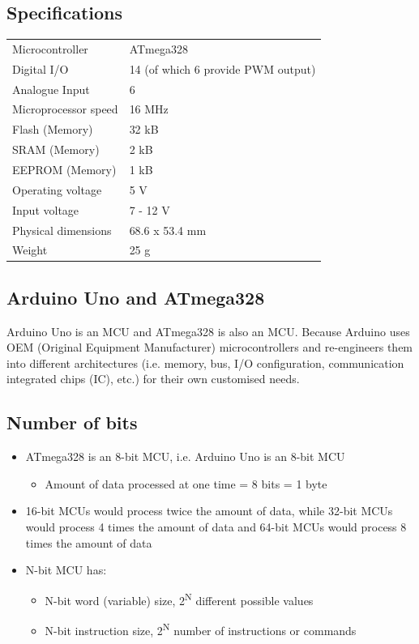 \documentclass[11pt]{article}
\begin{document}
\subsection{Specifications}
\label{sec:orgaaf1ed2}
\begin{center}
\begin{tabular}{l|l}
Microcontroller & ATmega328\\[0pt]
Digital I/O & 14 (of which 6 provide PWM output)\\[0pt]
Analogue Input & 6\\[0pt]
Microprocessor speed & 16 MHz\\[0pt]
Flash (Memory) & 32 kB\\[0pt]
SRAM (Memory) & 2 kB\\[0pt]
EEPROM (Memory) & 1 kB\\[0pt]
Operating voltage & 5 V\\[0pt]
Input voltage & 7 - 12 V\\[0pt]
Physical dimensions & 68.6 x 53.4 mm\\[0pt]
Weight & 25 g\\[0pt]
\end{tabular}
\end{center}

\subsection{Arduino Uno and ATmega328}
\label{sec:org1f96fc3}
Arduino Uno is an MCU and ATmega328 is also an MCU. Because Arduino uses OEM (Original Equipment Manufacturer) microcontrollers and re-engineers them into different architectures (i.e. memory, bus, I/O configuration, communication integrated chips (IC), etc.) for their own customised needs.

\subsection{Number of bits}
\label{sec:orgbfe2abe}
\begin{itemize}
\item ATmega328 is an 8-bit MCU, i.e. Arduino Uno is an 8-bit MCU
\begin{itemize}
\item Amount of data processed at one time = 8 bits = 1 byte
\end{itemize}
\item 16-bit MCUs would process twice the amount of data, while 32-bit MCUs would process 4 times the amount of data and 64-bit MCUs would process 8 times the amount of data
\item N-bit MCU has:
\begin{itemize}
\item N-bit word (variable) size, 2\textsuperscript{N} different possible values
\item N-bit instruction size, 2\textsuperscript{N} number of instructions or commands
\end{itemize}
\end{itemize}
\end{document}
